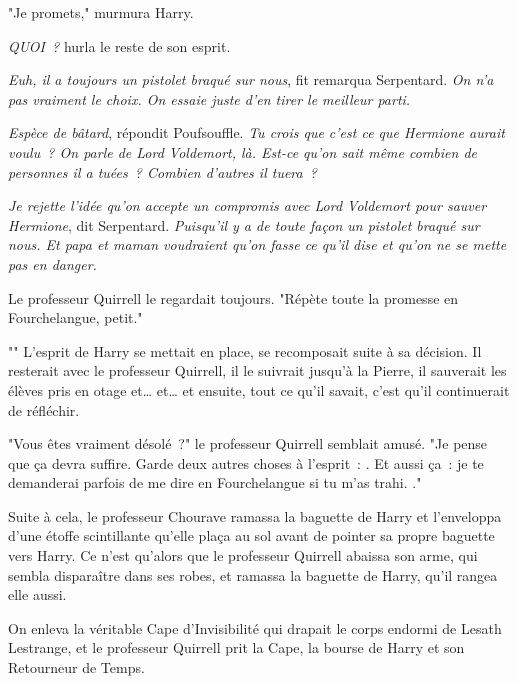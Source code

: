 "Je promets," murmura Harry.

\emph{QUOI~?} hurla le reste de son esprit.

\emph{Euh, il a toujours un pistolet braqué sur nous}, fit remarqua Serpentard. \emph{On n'a pas vraiment le choix. On essaie juste d'en tirer le meilleur parti.}

\emph{Espèce de bâtard}, répondit Poufsouffle. \emph{Tu crois que c'est ce que Hermione aurait voulu~? On parle de Lord Voldemort, là. Est-ce qu'on sait même combien de personnes il a tuées~? Combien d'autres il tuera~?}

\emph{Je rejette l'idée qu'on accepte un compromis avec Lord Voldemort pour sauver Hermione}, dit Serpentard. \emph{Puisqu'il y a de toute façon un pistolet braqué sur nous. Et papa et maman voudraient qu'on fasse ce qu'il dise et qu'on ne se mette pas en danger.}

Le professeur Quirrell le regardait toujours. "Répète toute la promesse en Fourchelangue, petit."

"" L'esprit de Harry se mettait en place, se recomposait suite à sa décision. Il resterait avec le professeur Quirrell, il le suivrait jusqu'à la Pierre, il sauverait les élèves pris en otage et… et… et ensuite, tout ce qu'il savait, c'est qu'il continuerait de réfléchir.

"Vous êtes vraiment désolé~?" le professeur Quirrell semblait amusé. "Je pense que ça devra suffire. Garde deux autres choses à l'esprit~: . Et aussi ça~: je te demanderai parfois de me dire en Fourchelangue si tu m'as trahi. ."

\later

Suite à cela, le professeur Chourave ramassa la baguette de Harry et l'enveloppa d'une étoffe scintillante qu'elle plaça au sol avant de pointer sa propre baguette vers Harry. Ce n'est qu'alors que le professeur Quirrell abaissa son arme, qui sembla disparaître dans ses robes, et ramassa la baguette de Harry, qu'il rangea elle aussi.

On enleva la véritable Cape d'Invisibilité qui drapait le corps endormi de Lesath Lestrange, et le professeur Quirrell prit la Cape, la bourse de Harry et son Retourneur de Temps.

